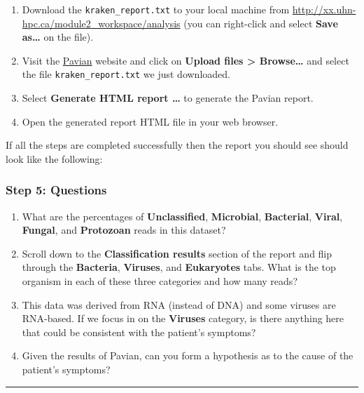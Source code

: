 \documentclass[
]{book}
\providecommand{\tightlist}{%
  \setlength{\itemsep}{0pt}\setlength{\parskip}{0pt}}
\begin{document}
\begin{enumerate}
\def\labelenumi{\arabic{enumi}.}
\item
  Download the \texttt{kraken\_report.txt} to your local machine from \url{http://xx.uhn-hpc.ca/module2_workspace/analysis} (you can right-click and select \textbf{Save as\ldots{}} on the file).
\item
  Visit the \href{https://fbreitwieser.shinyapps.io/pavian/}{Pavian} website and click on \textbf{Upload files \textgreater{} Browse\ldots{}} and select the file \texttt{kraken\_report.txt} we just downloaded.
\item
  Select \textbf{Generate HTML report \ldots{}} to generate the Pavian report.
\item
  Open the generated report HTML file in your web browser.
\end{enumerate}

If all the steps are completed successfully then the report you should see should look like the following:

\subsubsection{Step 5: Questions}\label{step-5-questions}

\begin{enumerate}
\def\labelenumi{\arabic{enumi}.}
\tightlist
\item
  What are the percentages of \textbf{Unclassified}, \textbf{Microbial}, \textbf{Bacterial}, \textbf{Viral}, \textbf{Fungal}, and \textbf{Protozoan} reads in this dataset?
\item
  Scroll down to the \textbf{Classification results} section of the report and flip through the \textbf{Bacteria}, \textbf{Viruses}, and \textbf{Eukaryotes} tabs. What is the top organism in each of these three categories and how many reads?
\item
  This data was derived from RNA (instead of DNA) and some viruses are RNA-based. If we focus in on the \textbf{Viruses} category, is there anything here that could be consistent with the patient's symptoms?
\item
  Given the results of Pavian, can you form a hypothesis as to the cause of the patient's symptoms?
\end{enumerate}

\begin{center}\rule{0.5\linewidth}{0.5pt}\end{center}
\end{document}
